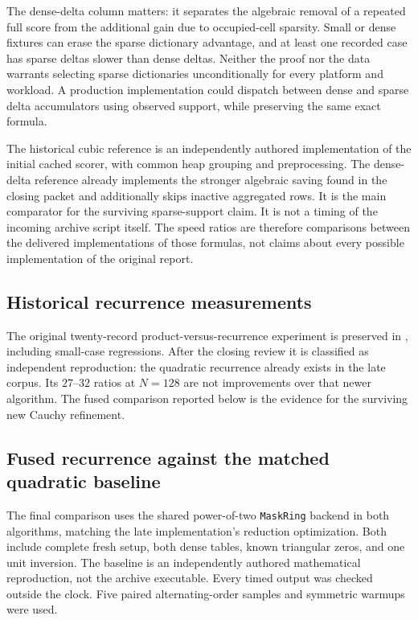 \documentclass[11pt,letterpaper]{article}
\theoremstyle{remark}\newtheorem{remark}[theorem]{Remark}
\begin{document}
The dense-delta column matters: it separates the algebraic removal of a repeated full score from the additional gain due to occupied-cell sparsity. Small or dense fixtures can erase the sparse dictionary advantage, and at least one recorded case has sparse deltas slower than dense deltas. Neither the proof nor the data warrants selecting sparse dictionaries unconditionally for every platform and workload. A production implementation could dispatch between dense and sparse delta accumulators using observed support, while preserving the same exact formula.

The historical cubic reference is an independently authored implementation of the initial cached scorer, with common heap grouping and preprocessing. The dense-delta reference already implements the stronger algebraic saving found in the closing packet and additionally skips inactive aggregated rows. It is the main comparator for the surviving sparse-support claim. It is not a timing of the incoming archive script itself. The speed ratios are therefore comparisons between the delivered implementations of those formulas, not claims about every possible implementation of the original report.

\subsection{Historical recurrence measurements}
The original twenty-record product-versus-recurrence experiment is preserved in
, including small-case regressions.
After the closing review it is classified as independent reproduction: the
quadratic recurrence already exists in the late corpus. Its $27$--$32$ ratios
at $N=128$ are not improvements over that newer algorithm. The fused comparison
reported below is the evidence for the surviving new Cauchy refinement.

\subsection{Fused recurrence against the matched quadratic baseline}
The final comparison uses the shared power-of-two \texttt{MaskRing} backend
in both algorithms, matching the late implementation's reduction optimization.
Both include complete fresh setup, both dense tables, known triangular zeros,
and one unit inversion. The baseline is an independently authored mathematical
reproduction, not the archive executable. Every timed output was checked outside
the clock. Five paired alternating-order samples and symmetric warmups were used.
\end{document}
